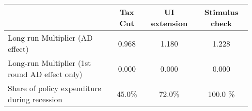\begin{tabular}{@{}lccc@{}} 
\toprule 
& Tax Cut    & UI extension    & Stimulus check    \\  \midrule 
Long-run Multiplier (AD effect) &0.968  & 1.180  & 1.228     \\ 
Long-run Multiplier (1st round AD effect only) &0.000  & 0.000  & 0.000     \\ 
Share of policy expenditure during recession &45.0\%  & 72.0\%  & 100.0 \%    \\ 
\end{tabular}  
